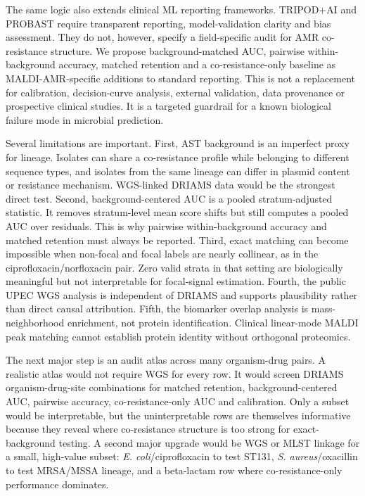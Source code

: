 \documentclass[11pt]{article}
\begin{document}
The same logic also extends clinical ML reporting frameworks. TRIPOD+AI and PROBAST require transparent reporting, model-validation clarity and bias assessment\cite{probast2019,tripodAI2024}. They do not, however, specify a field-specific audit for AMR co-resistance structure. We propose background-matched AUC, pairwise within-background accuracy, matched retention and a co-resistance-only baseline as MALDI-AMR-specific additions to standard reporting. This is not a replacement for calibration, decision-curve analysis, external validation, data provenance or prospective clinical studies. It is a targeted guardrail for a known biological failure mode in microbial prediction.

Several limitations are important. First, AST background is an imperfect proxy for lineage. Isolates can share a co-resistance profile while belonging to different sequence types, and isolates from the same lineage can differ in plasmid content or resistance mechanism. WGS-linked DRIAMS data would be the strongest direct test. Second, background-centered AUC is a pooled stratum-adjusted statistic. It removes stratum-level mean score shifts but still computes a pooled AUC over residuals. This is why pairwise within-background accuracy and matched retention must always be reported. Third, exact matching can become impossible when non-focal and focal labels are nearly collinear, as in the ciprofloxacin/norfloxacin pair. Zero valid strata in that setting are biologically meaningful but not interpretable for focal-signal estimation. Fourth, the public UPEC WGS analysis is independent of DRIAMS and supports plausibility rather than direct causal attribution. Fifth, the biomarker overlap analysis is mass-neighborhood enrichment, not protein identification. Clinical linear-mode MALDI peak matching cannot establish protein identity without orthogonal proteomics.

The next major step is an audit atlas across many organism-drug pairs. A realistic atlas would not require WGS for every row. It would screen DRIAMS organism-drug-site combinations for matched retention, background-centered AUC, pairwise accuracy, co-resistance-only AUC and calibration. Only a subset would be interpretable, but the uninterpretable rows are themselves informative because they reveal where co-resistance structure is too strong for exact-background testing. A second major upgrade would be WGS or MLST linkage for a small, high-value subset: \textit{E. coli}/ciprofloxacin to test ST131, \textit{S. aureus}/oxacillin to test MRSA/MSSA lineage, and a beta-lactam row where co-resistance-only performance dominates.
\end{document}
